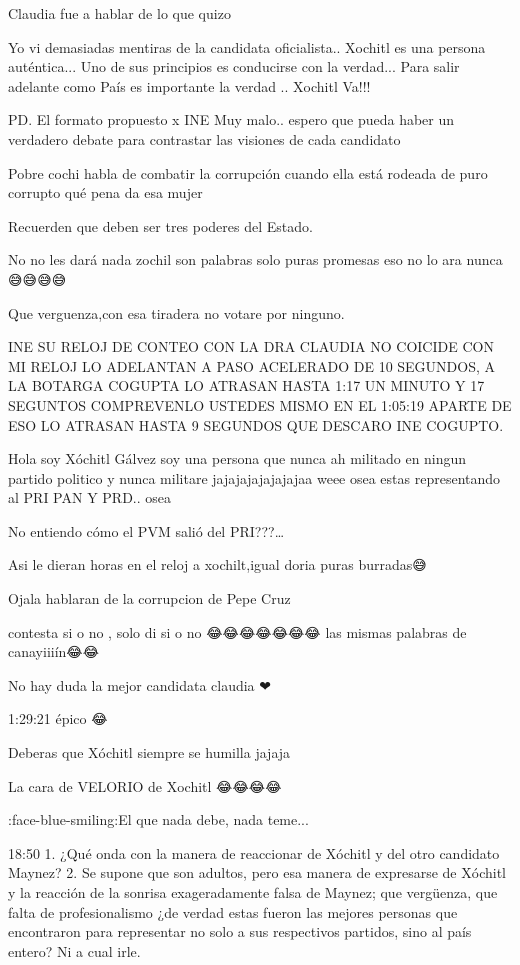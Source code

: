 Claudia fue a hablar de lo que quizo

Yo vi demasiadas mentiras de la candidata oficialista.. Xochitl es una persona auténtica... Uno de sus principios es conducirse con la verdad... Para salir adelante como País es importante la verdad .. Xochitl Va!!! 

PD. El formato propuesto x INE Muy malo.. espero que pueda haber un verdadero debate para contrastar las visiones de cada candidato

Pobre cochi habla de combatir la corrupción cuando ella está rodeada de puro corrupto qué pena da esa mujer

Recuerden que deben ser tres poderes del Estado.

No no les dará nada zochil  son palabras solo puras promesas eso no lo ara nunca 😅😅😅😅

Que verguenza,con esa tiradera no votare por ninguno.

INE SU RELOJ DE CONTEO CON LA DRA CLAUDIA NO COICIDE CON MI RELOJ LO ADELANTAN A PASO ACELERADO DE 10 SEGUNDOS, A LA BOTARGA COGUPTA LO ATRASAN HASTA 1:17 UN MINUTO Y 17 SEGUNTOS COMPREVENLO USTEDES MISMO EN EL 1:05:19 APARTE DE ESO LO ATRASAN HASTA 9 SEGUNDOS  QUE DESCARO INE COGUPTO.

Hola soy Xóchitl Gálvez soy una persona que nunca ah militado en ningun partido politico y nunca militare jajajajajajajajaa weee osea estas representando al PRI PAN Y PRD.. osea 🤣🤣

No entiendo cómo el PVM salió del PRI???…

Asi le dieran horas en el reloj a xochilt,igual doria puras burradas😅

Ojala hablaran de la corrupcion de Pepe Cruz

contesta si o no , solo di si o no 😂😂😂😂😂😂😂 las mismas palabras de canayiiiín😂😂

No hay duda  la mejor candidata claudia ❤

1:29:21 épico 😂

Deberas que Xóchitl siempre se humilla jajaja

La cara de VELORIO de Xochitl 😂😂😂😂

:face-blue-smiling:El que nada debe, nada teme...

18:50 1. ¿Qué onda con la manera de reaccionar de Xóchitl y del otro candidato Maynez? 2. Se supone que son adultos, pero esa manera de expresarse de Xóchitl y la reacción de la sonrisa exageradamente falsa de Maynez; que vergüenza, que falta de profesionalismo ¿de verdad estas fueron las mejores personas que encontraron para representar no solo a sus respectivos partidos, sino al país entero?  Ni a cual irle.

